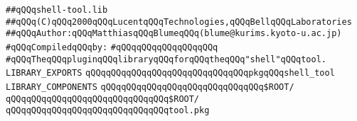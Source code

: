 \label{src/app/makelib/tools/shell/shell-tool.lib}
\verb|##qQQqshell-tool.lib|\newline
\verb|##qQQq(C)qQQq2000qQQqLucentqQQqTechnologies,qQQqBellqQQqLaboratories|\newline
\verb|##qQQqAuthor:qQQqMatthiasqQQqBlumeqQQq(blume@kurims.kyoto-u.ac.jp)|\newline
\newline
\verb|#qQQqCompiledqQQqby:|\newline
\verb|#qQQqqQQqqQQqqQQqqQQq|\newline
\newline
\newline
\newline
\verb|#qQQqTheqQQqpluginqQQqlibraryqQQqforqQQqtheqQQq"shell"qQQqtool.|\newline
\newline
\newline
\newline
\verb|LIBRARY_EXPORTS|\newline
\newline
\verb|qQQqqQQqqQQqqQQqqQQqqQQqqQQqqQQqpkgqQQqshell_tool|\newline
\newline
\newline
\newline
\verb|LIBRARY_COMPONENTS|\newline
\newline
\verb|qQQqqQQqqQQqqQQqqQQqqQQqqQQqqQQq$ROOT/|\newline
\verb|qQQqqQQqqQQqqQQqqQQqqQQqqQQqqQQq$ROOT/|\newline
\verb|qQQqqQQqqQQqqQQqqQQqqQQqqQQqqQQqtool.pkg|\newline

